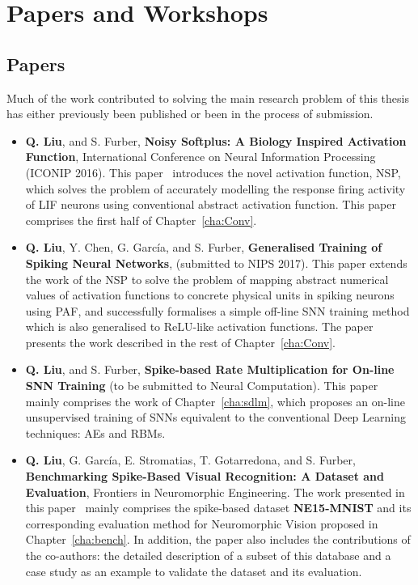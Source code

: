    
\section{Papers and Workshops}

\subsection{Papers}
	Much of the work contributed to solving the main research problem of this thesis has either previously been published or been in the process of submission.
\begin{itemize}

	\item 
	\textbf{Q. Liu}, and S. Furber, \textbf{Noisy Softplus: A Biology Inspired Activation Function}, International Conference on Neural Information Processing (ICONIP 2016). 
	This paper~\citep{liu2016noisy} introduces the novel activation function, NSP, 
	which solves the problem of accurately modelling the response firing activity of LIF neurons using conventional abstract activation function.
	This paper comprises the first half of Chapter~\ref{cha:Conv}.
	
	\item 
	\textbf{Q. Liu}, Y. Chen, G. Garc\'ia, and S. Furber, \textbf{Generalised Training of Spiking Neural Networks}, (submitted to NIPS 2017).
	This paper extends the work of the NSP to solve the problem of mapping abstract numerical values of activation functions to concrete physical units in spiking neurons using PAF, and successfully formalises a simple off-line SNN training method which is also generalised to ReLU-like activation functions.
	The paper presents the work described in the rest of Chapter~\ref{cha:Conv}.
	
	
	\item 
	\textbf{Q. Liu}, and S. Furber, \textbf{Spike-based Rate Multiplication for On-line SNN Training} (to be submitted to Neural Computation).
	This paper mainly comprises the work of Chapter~\ref{cha:sdlm}, which proposes an on-line unsupervised training of SNNs equivalent to the conventional Deep Learning techniques: AEs and RBMs.
	
	\item 
	\textbf{Q. Liu}, G. Garc\'ia, E. Stromatias, T. Gotarredona, and S. Furber, \textbf{Benchmarking Spike-Based Visual Recognition: A Dataset and Evaluation}, Frontiers in Neuromorphic Engineering.
	The work presented in this paper~\citep{liu2016bench} mainly comprises the spike-based dataset \textbf{NE15-MNIST} and its corresponding evaluation method for Neuromorphic Vision proposed in Chapter~\ref{cha:bench}.
	In addition, the paper also includes the contributions of the co-authors: the detailed description of a subset of this database and a case study as an example to validate the dataset and its evaluation. 
	
\end{itemize}

